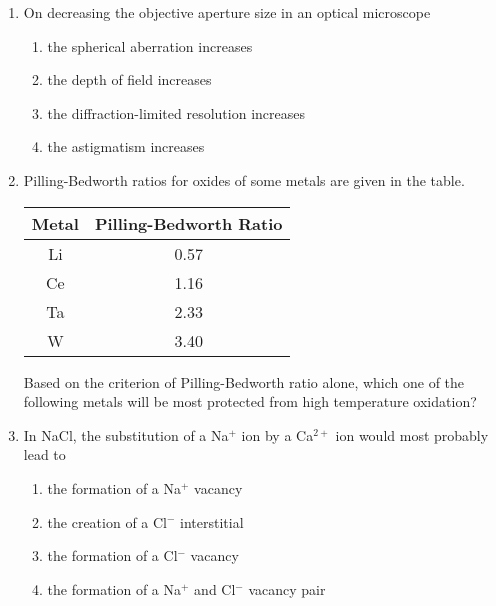 \begin{enumerate}

\item On decreasing the objective aperture size in an optical microscope

\begin{enumerate}
    \item the spherical aberration increases
    \item the depth of field increases
    \item the diffraction-limited resolution increases
    \item the astigmatism increases
\end{enumerate}
\bigskip

\item Pilling-Bedworth ratios for oxides of some metals are given in the table.

\begin{table}[h]    
  \centering
  \begin{tabular}{|c|c|}
    \hline
    Metal & Pilling-Bedworth Ratio \\
    \hline
    Li & 0.57 \\
    Ce & 1.16 \\
    Ta & 2.33 \\
    W & 3.40 \\
    \hline
    \end{tabular}
\end{table}

Based on the criterion of Pilling-Bedworth ratio alone, which one of the following metals will be most protected from high temperature oxidation?

\begin{enumerate}
\end{enumerate}
\bigskip

\item In NaCl, the substitution of a Na$^+$ ion by a Ca$^{2+}$ ion would most probably lead to

\begin{enumerate}
    \item the formation of a Na$^+$ vacancy
    \item the creation of a Cl$^-$ interstitial
    \item the formation of a Cl$^-$ vacancy
    \item the formation of a Na$^+$ and Cl$^-$ vacancy pair
\end{enumerate}
\bigskip


\end{enumerate}
